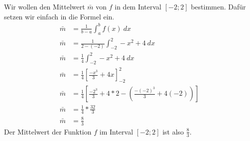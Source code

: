 \begin{center}
\end{center}

\begin{flushleft}
    Wir wollen den Mittelwert $\bar{m}$ von $f$ in dem Interval $\left[-2;2\right]$ bestimmen.
    Dafür setzen wir einfach in die Formel ein.
    \begin{align}
        \bar{m}&=\frac{1}{b-a}\int_{a}^{b} f(x) \ dx \\
        \bar{m}&=\frac{1}{2-(-2)}\int_{-2}^{2} -x^2+4 \ dx \\
        \bar{m}&=\frac{1}{4}\int_{-2}^{2} -x^2+4 \ dx \\
        \bar{m}&=\frac{1}{4}\left[\frac{-x^3}{3}+4x\right]_{-2}^{2} \\
        \bar{m}&=\frac{1}{4}\left[\frac{-2^3}{3}+4*2-\left(\frac{-(-2)^3}{3}+4(-2)\right)\right] \\
        \bar{m}&=\frac{1}{4}*\frac{32}{3} \\
        \bar{m}&=\frac{8}{3}
    \end{align}
    Der Mittelwert der Funktion $f$ im Interval $\left[-2;2\right]$ ist also $\frac{8}{3}$.
\end{flushleft}

\begin{center}
\end{center}

